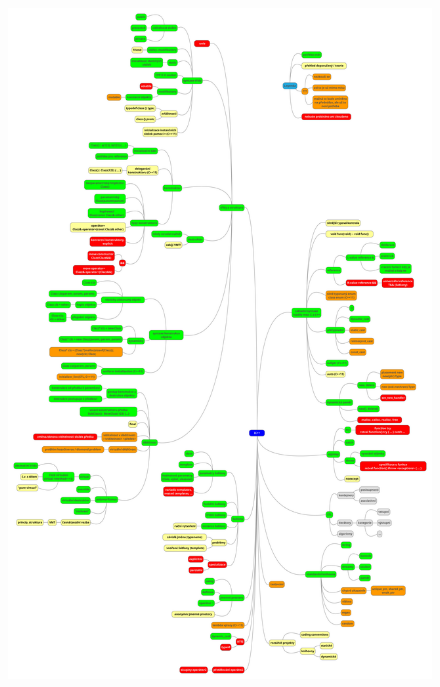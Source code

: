 \begin{frame}[fragile]
\vfill
\begin{figure}
\centering
\includegraphics[width=0.48\linewidth]{img/mindmap.pdf}
\end{figure}
\vfill
\end{frame}